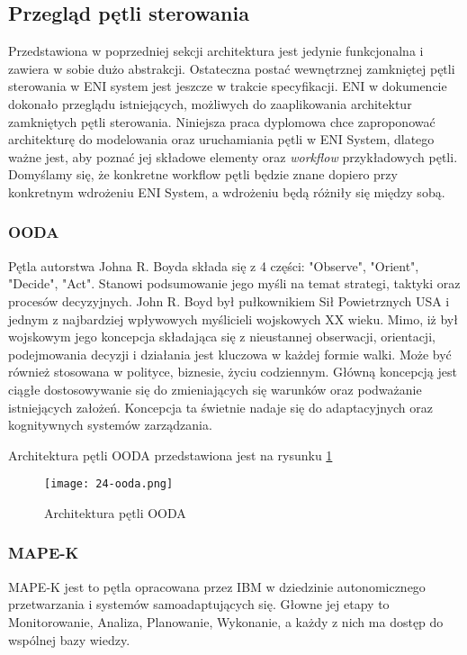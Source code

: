 \subsection{Przegląd pętli sterowania}

Przedstawiona w poprzedniej sekcji architektura jest jedynie funkcjonalna i zawiera w sobie dużo abstrakcji. Ostateczna postać wewnętrznej zamkniętej pętli sterowania w ENI system jest jeszcze w trakcie specyfikacji. ENI w dokumencie \cite{enioverview} dokonało przeglądu istniejących, możliwych do zaaplikowania architektur zamkniętych pętli sterowania. Niniejsza praca dyplomowa chce zaproponować architekturę do modelowania oraz uruchamiania pętli w ENI System, dlatego ważne jest, aby poznać jej składowe elementy oraz \textit{workflow} przykładowych pętli. Domyślamy się, że konkretne workflow pętli będzie znane dopiero przy konkretnym wdrożeniu ENI System, a wdrożeniu będą różniły się między sobą. 

\subsubsection{OODA}
Pętla autorstwa Johna R. Boyda składa się z 4 części: "Observe", "Orient", "Decide", "Act". Stanowi podsumowanie jego myśli na temat strategi, taktyki oraz procesów decyzyjnych. John R. Boyd był pułkownikiem Sił Powietrznych USA i jednym z najbardziej wpływowych myślicieli wojskowych XX wieku. Mimo, iż był wojskowym jego koncepcja składająca się z nieustannej obserwacji, orientacji, podejmowania decyzji i działania jest kluczowa w każdej formie walki. Może być również stosowana w polityce, biznesie, życiu codziennym. Główną koncepcją jest ciągłe dostosowywanie się do zmieniających się warunków oraz podważanie istniejących założeń. Koncepcja ta świetnie nadaje się do adaptacyjnych oraz kognitywnych systemów zarządzania.

Architektura pętli OODA przedstawiona jest na rysunku \ref{fig:24-ooda}

\begin{figure}[!h]
    \centering \texttt{[image: 24-ooda.png]}
    \caption{Architektura pętli OODA}\label{fig:24-ooda}
\end{figure}


\subsubsection{MAPE-K}
MAPE-K jest to pętla opracowana przez IBM w dziedzinie autonomicznego przetwarzania i systemów samoadaptujących się. Głowne jej etapy to Monitorowanie, Analiza, Planowanie, Wykonanie, a każdy z nich ma dostęp do wspólnej bazy wiedzy. 

